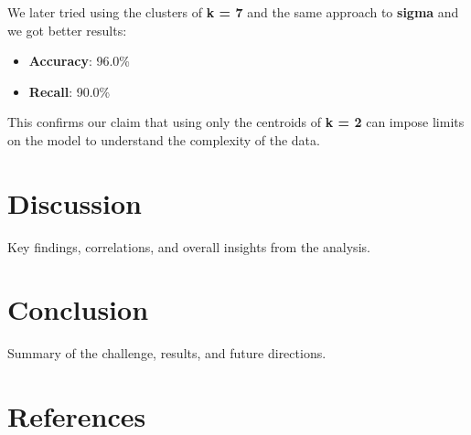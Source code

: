 \documentclass[a4paper,12pt]{article}
\begin{document}
We later tried using the clusters of \textbf{k = 7} and the same approach to \textbf{sigma} and we got better results:
\begin{itemize}
    \item \textbf{Accuracy}: 96.0\%
    \item \textbf{Recall}: 90.0\%
\end{itemize}
This confirms our claim that using only the centroids of \textbf{k = 2} can impose limits on the model to understand the complexity of the data.
\section{Discussion}
\label{sec:discussion}
Key findings, correlations, and overall insights from the analysis.

\section{Conclusion}
\label{sec:conclusion}
Summary of the challenge, results, and future directions.

\section*{References}
\label{sec:references}
\end{document}
